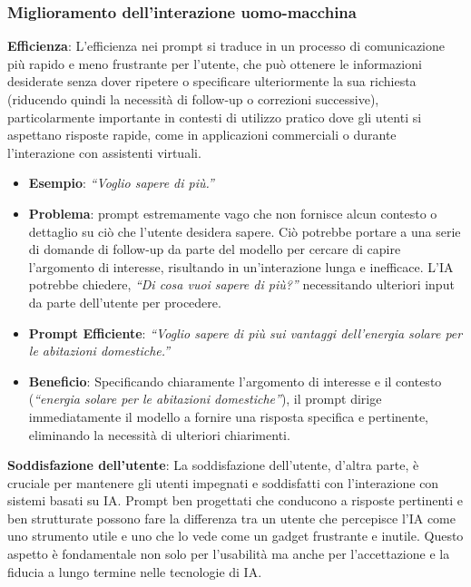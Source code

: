         \subsubsection{Miglioramento dell'interazione uomo-macchina}
            \textbf{Efficienza}: L'efficienza nei prompt si traduce in un processo di comunicazione più rapido e meno frustrante per l'utente, che può ottenere le informazioni desiderate senza dover ripetere o specificare ulteriormente la sua richiesta (riducendo quindi la necessità di follow-up o correzioni successive), particolarmente importante in contesti di utilizzo pratico dove gli utenti si aspettano risposte rapide, come in applicazioni commerciali o durante l'interazione con assistenti virtuali.
            \begin{itemize}
                \item \textbf{Esempio}: \textit{``Voglio sapere di più.''}
                \item \textbf{Problema}: prompt estremamente vago che non fornisce alcun contesto o dettaglio su ciò che l'utente desidera sapere. Ciò potrebbe portare a una serie di domande di follow-up da parte del modello per cercare di capire l'argomento di interesse, risultando in un'interazione lunga e inefficace. L'IA potrebbe chiedere, \textit{``Di cosa vuoi sapere di più?''} necessitando ulteriori input da parte dell'utente per procedere.
                \item \textbf{Prompt Efficiente}: \textit{``Voglio sapere di più sui vantaggi dell'energia solare per le abitazioni domestiche.''}
                \item \textbf{Beneficio}: Specificando chiaramente l'argomento di interesse e il contesto (\textit{``energia solare per le abitazioni domestiche''}), il prompt dirige immediatamente il modello a fornire una risposta specifica e pertinente, eliminando la necessità di ulteriori chiarimenti.
            \end{itemize}
            \textbf{Soddisfazione dell'utente}: La soddisfazione dell'utente, d'altra parte, è cruciale per mantenere gli utenti impegnati e soddisfatti con l'interazione con sistemi basati su IA. Prompt ben progettati che conducono a risposte pertinenti e ben strutturate possono fare la differenza tra un utente che percepisce l'IA come uno strumento utile e uno che lo vede come un gadget frustrante e inutile. Questo aspetto è fondamentale non solo per l'usabilità ma anche per l'accettazione e la fiducia a lungo termine nelle tecnologie di IA.
